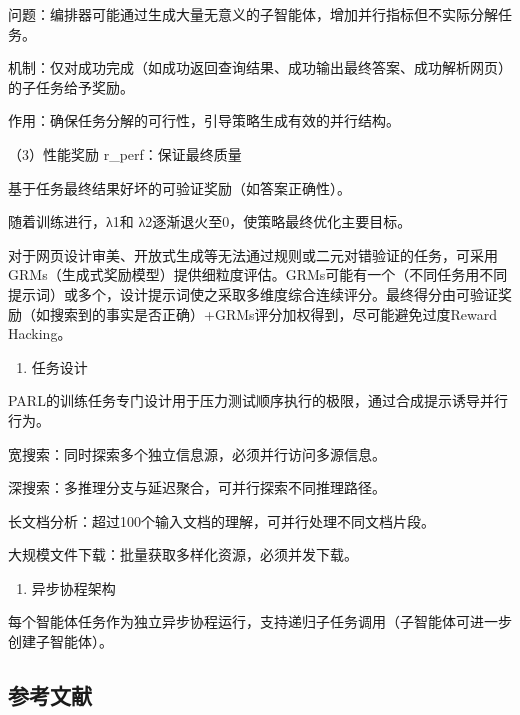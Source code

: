 问题：编排器可能通过生成大量无意义的子智能体，增加并行指标但不实际分解任务。

机制：仅对成功完成（如成功返回查询结果、成功输出最终答案、成功解析网页）的子任务给予奖励。

作用：确保任务分解的可行性，引导策略生成有效的并行结构。

（3）性能奖励 r\_perf：保证最终质量

基于任务最终结果好坏的可验证奖励（如答案正确性）。

随着训练进行，λ1和 λ2逐渐退火至0，使策略最终优化主要目标。

对于网页设计审美、开放式生成等无法通过规则或二元对错验证的任务，可采用GRMs（生成式奖励模型）提供细粒度评估。GRMs可能有一个（不同任务用不同提示词）或多个，设计提示词使之采取多维度综合连续评分。最终得分由可验证奖励（如搜索到的事实是否正确）+GRMs评分加权得到，尽可能避免过度Reward Hacking。

\begin{enumerate}
\def\labelenumi{\arabic{enumi}.}
\setcounter{enumi}{3}
\tightlist
\item
  任务设计
\end{enumerate}

PARL的训练任务专门设计用于压力测试顺序执行的极限，通过合成提示诱导并行行为。

宽搜索：同时探索多个独立信息源，必须并行访问多源信息。

深搜索：多推理分支与延迟聚合，可并行探索不同推理路径。

长文档分析：超过100个输入文档的理解，可并行处理不同文档片段。

大规模文件下载：批量获取多样化资源，必须并发下载。

\begin{enumerate}
\def\labelenumi{\arabic{enumi}.}
\setcounter{enumi}{4}
\tightlist
\item
  异步协程架构
\end{enumerate}

每个智能体任务作为独立异步协程运行，支持递归子任务调用（子智能体可进一步创建子智能体）。

\hypertarget{ux53c2ux8003ux6587ux732e-116}{%
\subsection{参考文献}\label{ux53c2ux8003ux6587ux732e-116}}

